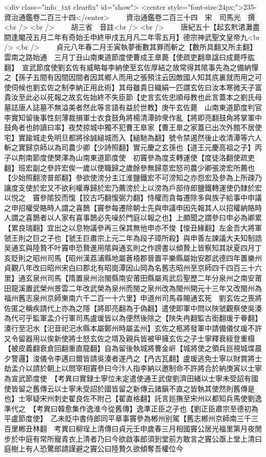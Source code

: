 <div class="info_txt clearfix" id="show">
<center style="font-size:24px;">235-資治通鑑卷二百三十四</center>
  　　資治通鑑卷二百三十四　宋　司馬光　撰<br />
<br />
　　胡三省　音註<br />
<br />
　　唐紀五十【起玄黓涒灘盡閼逢閹茂五月二年有奇始壬申終甲戌五月凡二年零五月】德宗神武聖文皇帝九<br />
<br />
　　貞元八年春二月壬寅執夢衝數其罪而斬之【數所具翻又所主翻】雲南之路始通　三月丁丑山南東道節度使曹成王臯薨【使疏吏翻臯諡曰成薨呼肱翻】　宣武節度使劉玄佐有威略每李納使至玄佐厚結之故常得其隂事先為之備納憚之【孫子五間有因間因間者因其鄉人而用之張預注云因敵國人知其㡳裏就而用之可使伺候也劉玄佐之制李納正用此術】其母雖貴日織絹一匹謂玄佐曰汝本寒微天子富貴汝至此必以死報之故玄佐始終不失臣節【史言玄佐忠順母教也此言蓋本之劉氏母墓誌唐人誌墓不無溢美者然此等言語有益於世教】庚午玄佐薨　山南東道節度判官李實知留後事性刻薄裁損軍士衣食鼓角將楊清潭帥衆作亂【將即亮翻鼓角將掌軍中鼓角者也帥讀曰率】夜焚掠城中獨不犯曹王臯家【曹王臯之家蓋已出次外館不居使宅】實踰城走免明旦都將徐誠縋城而入【縋馳為翻】號令禁遏然後止收清潭等六人斬之實歸京師以為司農少卿【少詩照翻】實元慶之玄孫也【道王元慶高祖之子】丙子以荆南節度使樊澤為山南東道節度使　初竇參為度支轉運使【度徒洛翻使疏吏翻】班宏副之參許宏俟一歲以使職歸之歲餘參無歸意宏怒司農少卿張滂宏所薦也【少始照翻滂普郎翻】參欲使滂分主江淮鹽鐵宏不可滂知之亦怨宏及參為上所疎乃讓度支使於宏又不欲利權專歸於宏乃薦滂於上以滂為戶部侍郎鹽鐵轉運使仍隸於宏以悦之　竇參隂狡而愎【狡古巧翻愎弼力翻】恃權而貪每遷除多與族子給事中申議之申招權受賂時人謂之喜鵲【竇参每遷除朝士先與申議申因先報其人以招權納賂時人謂之喜鵲者以人家有喜事鵲必先噪於門庭以報之也】上頗聞之謂參曰申必為卿累【累良瑞翻】宜出之以息物議參再三保其無他申亦不悛【悛丑緣翻】左金吾大將軍虢王則之巨之子也【虢王巨肅宗上元二年為段子璋所殺】與申善左諫議大夫知制誥吴通玄與陸贄不叶竇申恐贄進用隂與通玄則之作謗書以傾贄上皆察知其狀夏四月丁亥貶則之昭州司馬【昭州漢荔浦縣地屬蒼梧郡晉置平樂縣屬始安郡武德四年置樂州貞觀八年改曰昭州宋白曰郡北有昭崗潭因山岡為名舊志昭州至京師四千四百三十六里】通玄泉州司馬【隋置泉州治閩縣南安莆田縣屬焉武后聖歷二年分泉州之南安莆田龍溪置武榮州景雲二年改武榮為泉州而閩之泉州改為閩州開元十三年又改閩州為福州舊志泉州京師東南六千二百一十六里】申道州司馬尋賜通玄死　劉玄佐之喪將佐匿之稱疾請代上亦為之隱【將即亮翻為于偽翻】遣使即軍中問以陜虢觀察使吳湊為代可乎監軍孟介行軍司馬盧瑗皆以為便然後除之【陜失冉翻監古銜翻瑗于眷翻】湊行至汜水【汜音祀汜水縣本屬鄭州時屬孟州】玄佐之柩將發軍中請備儀仗瑗不許又令留器用以俟新使將士怒玄佐之壻及親兵皆被甲擁玄佐之子士寧釋衰絰登重榻【被皮義翻衰倉回翻重直龍翻】自為留後執城將曹金㟁【城將使之領兵廵視城堞晨夕警邏】浚儀令李邁曰爾皆請吳湊者遂冎之【冎古瓦翻】盧瑗逃免士寧以財賞將士劫孟介以請於朝上以問宰相竇參曰今汴人指李納以邀制命不許將合於納庚寅以士寧為宣武節度使　【考異曰實録士寧位未定遣使通王武俊劉濟田緒以士寧未受詔有國使皆留之舊傳云以士寧未受詔於國皆留之新傳云諸鎭不直之皆執其使然則舊傳是也】士寧疑宋州刺史翟良佐不附己【翟直格翻】託言廵撫至宋州以都知兵馬使劉逸準代之　【考異曰韓愈集作逸淮今從舊傳】逸準正臣之子也【劉正臣肅宗至德初為平盧節度使】　乙未貶中書侍郎同平章事竇參為郴州别駕【舊志郴州京師南三千三百里郴丑林翻　考異曰柳珵上清傳曰貞元壬申歲春三月相國竇公居光福里第月夜閒步於中庭有常所寵青衣上清者乃曰今欲啟事郎須到堂前方敢言之竇公亟上堂上清曰庭樹上有人恐驚郎請謹避之竇公曰陸贄久欲傾奪吾權位今
